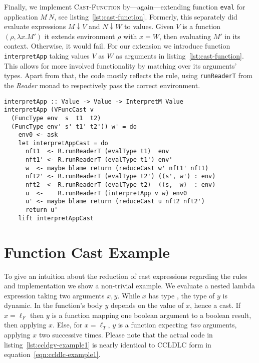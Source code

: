 Finally, we implement \textsc{Cast-Function} by---again---extending function \texttt{eval} for application $M~N$, see listing~\ref{lst:cast-function}. Formerly, this separately did evaluate expressions $M \downarrow V$ and $N \downarrow W$ to values. Given $V$ is a function $(\rho, \lambda x. M')$ it extends environment $\rho$ with $x=W$, then evaluating $M'$ in its context. Otherwise, it would fail. For our extension we introduce function \texttt{interpretApp} taking values $V$ as $W$ as arguments in listing~\ref{lst:cast-function}. This allows for more involved functionality by matching over its arguments' types. Apart from that, the code mostly reflects the rule, using \texttt{runReaderT} from the \emph{Reader} monad to respectively pass the correct environment.

\begin{lstlisting}[float,
  caption=Haskell: Rule \textsc{Cast-Function} (\texttt{Interpreter.hs}),
  label=lst:cast-function]
interpretApp :: Value -> Value -> InterpretM Value
interpretApp (VFuncCast v
  (FuncType env  s  t1  t2)
  (FuncType env' s' t1' t2')) w' = do
    env0 <- ask
    let interpretAppCast = do
      nft1  <- R.runReaderT (evalType t1)  env
      nft1' <- R.runReaderT (evalType t1') env'
      w  <- maybe blame return (reduceCast w' nft1' nft1)
      nft2' <- R.runReaderT (evalType t2') ((s', w') : env)
      nft2  <- R.runReaderT (evalType t2)  ((s,  w)  : env)
      u  <-    R.runReaderT (interpretApp v w) env0
      u' <- maybe blame return (reduceCast u nft2 nft2')
      return u'
    lift interpretAppCast
\end{lstlisting}

\section{Function Cast Example}

To give an intuition about the reduction of cast expressions regarding the rules and implementation we show a non-trivial example. We evaluate a nested lambda expression taking two arguments $x,y$. While $x$ has type \Bool, the type of $y$ is dynamic. In the function's body $y$ depends on the value of $x$, hence a cast. If $x=\ell_F$ then $y$ is a function mapping one boolean argument to a boolean result, then applying $x$. Else, for $x=\ell_T$, $y$ is a function expecting \emph{two} arguments, applying $x$ two successive times. Please note that the actual code in listing~\ref{lst:ccldgv-example1} is nearly identical to CCLDLC form in equation~\ref{eqn:ccldlc-example1}.

